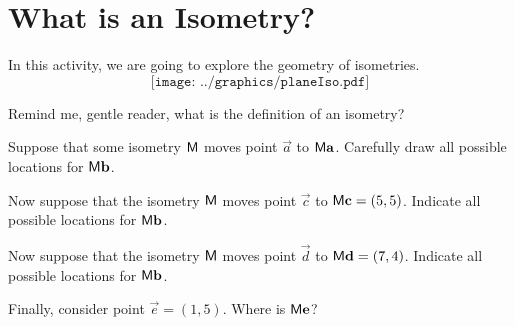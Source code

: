 \newpage
\section{What is an Isometry?}

In this activity, we are going to explore the geometry of isometries.
\[
\texttt{[image: ../graphics/planeIso.pdf]}
\]

\begin{prob}
Remind me, gentle reader, what is the definition of an isometry?
\end{prob}

\begin{prob}
Suppose that some isometry $\mathsf{M}$ moves point $\vec{a}$ to
$\mathsf{M}\mathbf{a}$. Carefully draw all possible locations for
$\mathsf{M}\mathbf{b}$.
\end{prob}

\begin{prob}
Now suppose that the isometry $\mathsf{M}$ moves point $\vec{c}$ to
$\mathsf{M}\mathbf{c} = (5,5)$. Indicate all possible locations for
$\mathsf{M}\mathbf{b}$.
\end{prob}

\begin{prob}
Now suppose that the isometry $\mathsf{M}$ moves point $\vec{d}$ to
$\mathsf{M}\mathbf{d} = (7,4)$. Indicate all possible locations for
$\mathsf{M}\mathbf{b}$.
\end{prob}



\begin{prob}
Finally, consider point $\vec{e} = (1,5)$. Where is $\mathsf{M}\mathbf{e}$?
\end{prob}

